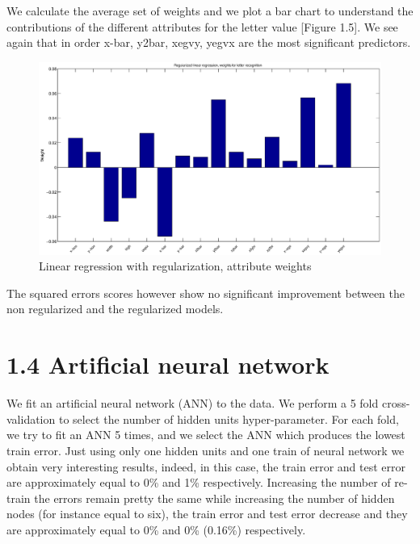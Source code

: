 We calculate the average set of weights and we plot a bar chart to understand the contributions of the different attributes for the letter value [Figure 1.5]. We see again that in order x-bar, y2bar, xegvy, yegvx are the most significant predictors. 

\begin{figure}[htbp]
\center
\includegraphics[width = 1.25\textwidth]{figure_p2/r6.eps}
\caption{Linear regression with regularization, attribute weights}
\end{figure}

The squared errors scores however show no significant improvement between the non regularized and the regularized models.

\section*{1.4 Artificial neural network}
We fit an artificial neural network (ANN) to the data. We perform a 5 fold cross-validation to select the number of hidden units hyper-parameter. For each fold, we try to fit an ANN 5 times, and we select the ANN which produces the lowest train error.
Just using only one hidden units and one train of neural network we obtain very interesting results, indeed, in this case, the train error and test error are approximately equal to 0\% and 1\% respectively. Increasing the number of re-train the errors remain pretty the same while increasing the number of hidden nodes (for instance equal to six), the train error and test error decrease and they are approximately equal to 0\% and 0\% (0.16\%) respectively.

